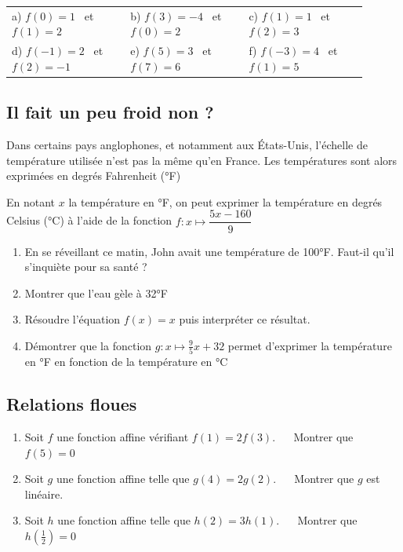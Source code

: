 \documentclass[oneside,12pt]{article}          %
\begin{document}
\begin{tabular}{p{0.3\linewidth} p{0.3\linewidth} p{0.3\linewidth}}
	a) $f(0)=1$ ~et~ $f(1)=2$ & b) $f(3)=-4$ ~et~ $f(0)=2$ & c) $f(1)=1$ ~et~ $f(2)=3$ \\
	d) $f(-1)=2$ ~et~ $f(2)=-1$ & e) $f(5)=3$ ~et~ $f(7)=6$ & f) $f(-3)=4$ ~et~ $f(1)=5$
\end{tabular}



\subsection{Il fait un peu froid non ?}
Dans certains pays anglophones, et notamment aux États-Unis, l'échelle de température utilisée n'est pas la même qu'en France. Les températures sont alors exprimées en degrés Fahrenheit (°F)

En notant $x$ la température en °F, on peut exprimer la température en degrés Celsius (°C) à l'aide de la fonction $f:x\mapsto\dfrac{5x-160}{9}$
\begin{enumerate}
	\item En se réveillant ce matin, John avait une température de 100°F. Faut-il qu'il s'inquiète pour sa santé ?
	\item Montrer que l'eau gèle à 32°F
	\item Résoudre l'équation $f(x)=x$ puis interpréter ce résultat.
	\item Démontrer que la fonction $g:x\mapsto\frac{9}{5}x+32$ permet d'exprimer la température en °F en fonction de la température en °C
\end{enumerate}



\subsection{Relations floues}
\begin{enumerate}
	\item Soit $f$ une fonction affine vérifiant $f(1)=2f(3)$. ~~ Montrer que $f(5)=0$
	\item Soit $g$ une fonction affine telle que $g(4)=2g(2)$. ~~ Montrer que $g$ est linéaire.
	\item Soit $h$ une fonction affine telle que $h(2)=3h(1)$. ~~ Montrer que $h\left(\frac{1}{2}\right)=0$
\end{enumerate}
\end{document}
